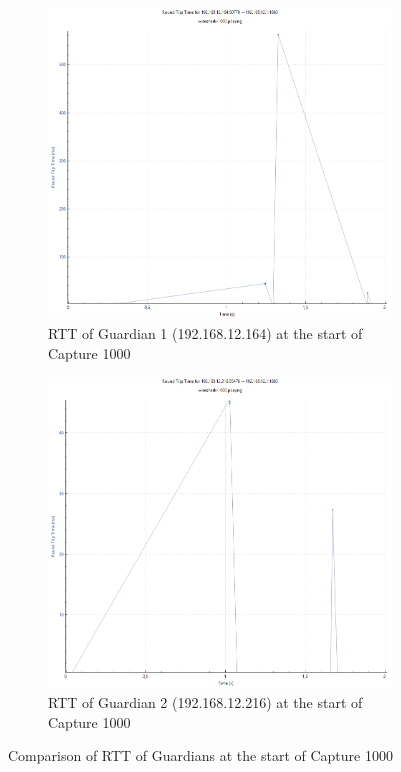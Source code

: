\begin{figure}[ht!]
    \centering
    \begin{subfigure}[b]{0.6\textwidth}
        \centering
        \includegraphics[width=\textwidth]{abbildungen/wireshark/1000-g1.png}
        \caption{\ac{RTT} of Guardian 1 (192.168.12.164) at the start of Capture 1000}
        \label{fig:rtt-g1}
    \end{subfigure}
    \hfill
    \begin{subfigure}[b]{0.6\textwidth}
        \centering
        \includegraphics[width=\textwidth]{abbildungen/wireshark/1000-g2.png}
        \caption{\ac{RTT} of Guardian 2 (192.168.12.216) at the start of Capture 1000}
        \label{fig:rtt-g2}
    \end{subfigure}
    \caption{Comparison of \ac{RTT} of Guardians at the start of Capture 1000}
    \label{fig:rtt}
\end{figure}
